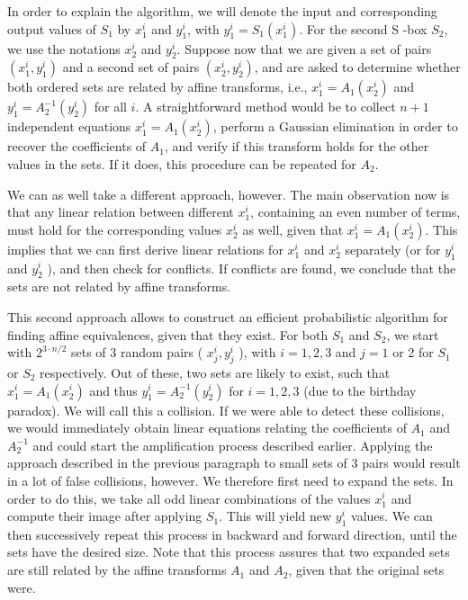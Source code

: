 \documentclass[10pt]{article}
\begin{document}
In order to explain the algorithm, we will denote the input and corresponding output values of $S_{1}$ by $x_{1}^{i}$ and $y_{1}^{i}$, with $y_{1}^{i}=S_{1}\left(x_{1}^{i}\right)$. For the second S -box $S_{2}$, we use the notations $x_{2}^{i}$ and $y_{2}^{i}$. Suppose now that we are given a set of pairs $\left(x_{1}^{i}, y_{1}^{i}\right)$ and a second set of pairs $\left(x_{2}^{i}, y_{2}^{i}\right)$, and are asked to determine whether both ordered sets are related by affine transforms, i.e., $x_{1}^{i}=A_{1}\left(x_{2}^{i}\right)$ and $y_{1}^{i}=A_{2}^{-1}\left(y_{2}^{i}\right)$ for all $i$. A straightforward method would be to collect $n+1$ independent equations $x_{1}^{i}=A_{1}\left(x_{2}^{i}\right)$, perform a Gaussian elimination in order to recover the coefficients of $A_{1}$, and verify if this transform holds for the other values in the sets. If it does, this procedure can be repeated for $A_{2}$.

We can as well take a different approach, however. The main observation now is that any linear relation between different $x_{1}^{i}$, containing an even number of terms, must hold for the corresponding values $x_{2}^{i}$ as well, given that $x_{1}^{i}=A_{1}\left(x_{2}^{i}\right)$. This implies that we can first derive linear relations for $x_{1}^{i}$ and $x_{2}^{i}$ separately (or for $y_{1}^{i}$ and $y_{2}^{i}$ ), and then check for conflicts. If conflicts are found, we conclude that the sets are not related by affine transforms.

This second approach allows to construct an efficient probabilistic algorithm for finding affine equivalences, given that they exist. For both $S_{1}$ and $S_{2}$, we start with $2^{3 \cdot n / 2}$ sets of 3 random pairs ( $x_{j}^{i}, y_{j}^{i}$ ), with $i=1,2,3$ and $j=1$ or 2 for $S_{1}$ or $S_{2}$ respectively. Out of these, two sets are likely to exist, such that $x_{1}^{i}=A_{1}\left(x_{2}^{i}\right)$ and thus $y_{1}^{i}=A_{2}^{-1}\left(y_{2}^{i}\right)$ for $i=1,2,3$ (due to the birthday paradox). We will call this a collision. If we were able to detect these collisions, we would immediately obtain linear equations relating the coefficients of $A_{1}$ and $A_{2}^{-1}$ and could start the amplification process described earlier. Applying the approach described in the previous paragraph to small sets of 3 pairs would result in a lot of false collisions, however. We therefore first need to expand the sets. In order to do this, we take all odd linear combinations of the values $x_{1}^{i}$ and compute their image after applying $S_{1}$. This will yield new $y_{1}^{i}$ values. We can then successively repeat this process in backward and forward direction, until the sets have the desired size. Note that this process assures that two expanded sets are still related by the affine transforms $A_{1}$ and $A_{2}$, given that the original sets were.
\end{document}
